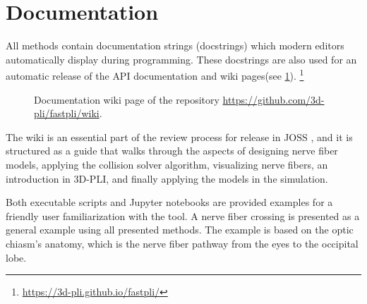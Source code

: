 \section{Documentation}
%
All methods contain documentation strings (docstrings)
which modern editors automatically display during programming.
These docstrings are also used for an automatic release of the \ac{API} documentation and wiki pages(see \cref{fig:fastpli_wiki}).
\footnote{\url{https://3d-pli.github.io/fastpli/}}
%
\begin{figure}[!t]
   \centering
  \caption[]{Documentation wiki page of the  repository \url{https://github.com/3d-pli/fastpli/wiki}.}
  \label{fig:fastpli_wiki}
\end{figure}
%
The wiki is an essential part of the review process for release in \ac{JOSS} \cite{Matuschke2021}, and it is structured as a guide that walks through the aspects of designing nerve fiber models, applying the collision solver algorithm, visualizing nerve fibers, an introduction in \ac{3D-PLI}, and finally applying the models in the simulation.
\par
%
Both executable \python{} scripts and Jupyter notebooks are provided examples for a friendly user familiarization with the tool. A nerve fiber crossing is presented as a general example using all presented methods. The example is based on the optic chiasm's anatomy, which is the nerve fiber pathway from the eyes to the occipital lobe.